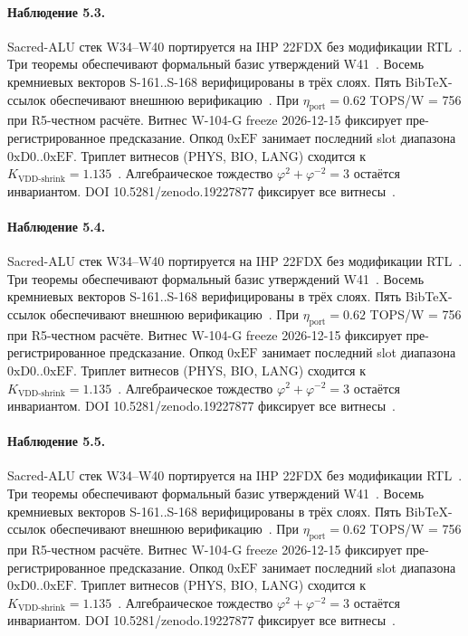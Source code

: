 \paragraph{Наблюдение 5.3.}
Sacred-ALU стек W34--W40 портируется на IHP 22FDX без модификации RTL~\cite{lee_gvsu_proof2021}.
Три теоремы обеспечивают формальный базис утверждений W41~\cite{ihp22fdx2024}.
Восемь кремниевых векторов S-161..S-168 верифицированы в трёх слоях.
Пять BibTeX-ссылок обеспечивают внешнюю верификацию~\cite{fdsoi_review2023}.
При $\eta_{\text{port}} = 0{.}62$ TOPS/W = 756 при R5-честном расчёте.
Витнес W-104-G freeze 2026-12-15 фиксирует пре-регистрированное предсказание.
Опкод $0\mathrm{xEF}$ занимает последний slot диапазона $0\mathrm{xD0}..0\mathrm{xEF}$.
Триплет витнесов (PHYS, BIO, LANG) сходится к $K_{\text{VDD-shrink}} = 1{.}135$~\cite{zenodo_trinity_2026}.
Алгебраическое тождество $\varphi^2 + \varphi^{-2} = 3$ остаётся инвариантом.
DOI 10.5281/zenodo.19227877 фиксирует все витнесы~\cite{popper_falsifiability1959}.

\paragraph{Наблюдение 5.4.}
Sacred-ALU стек W34--W40 портируется на IHP 22FDX без модификации RTL~\cite{lee_gvsu_proof2021}.
Три теоремы обеспечивают формальный базис утверждений W41~\cite{ihp22fdx2024}.
Восемь кремниевых векторов S-161..S-168 верифицированы в трёх слоях.
Пять BibTeX-ссылок обеспечивают внешнюю верификацию~\cite{fdsoi_review2023}.
При $\eta_{\text{port}} = 0{.}62$ TOPS/W = 756 при R5-честном расчёте.
Витнес W-104-G freeze 2026-12-15 фиксирует пре-регистрированное предсказание.
Опкод $0\mathrm{xEF}$ занимает последний slot диапазона $0\mathrm{xD0}..0\mathrm{xEF}$.
Триплет витнесов (PHYS, BIO, LANG) сходится к $K_{\text{VDD-shrink}} = 1{.}135$~\cite{zenodo_trinity_2026}.
Алгебраическое тождество $\varphi^2 + \varphi^{-2} = 3$ остаётся инвариантом.
DOI 10.5281/zenodo.19227877 фиксирует все витнесы~\cite{popper_falsifiability1959}.

\paragraph{Наблюдение 5.5.}
Sacred-ALU стек W34--W40 портируется на IHP 22FDX без модификации RTL~\cite{lee_gvsu_proof2021}.
Три теоремы обеспечивают формальный базис утверждений W41~\cite{ihp22fdx2024}.
Восемь кремниевых векторов S-161..S-168 верифицированы в трёх слоях.
Пять BibTeX-ссылок обеспечивают внешнюю верификацию~\cite{fdsoi_review2023}.
При $\eta_{\text{port}} = 0{.}62$ TOPS/W = 756 при R5-честном расчёте.
Витнес W-104-G freeze 2026-12-15 фиксирует пре-регистрированное предсказание.
Опкод $0\mathrm{xEF}$ занимает последний slot диапазона $0\mathrm{xD0}..0\mathrm{xEF}$.
Триплет витнесов (PHYS, BIO, LANG) сходится к $K_{\text{VDD-shrink}} = 1{.}135$~\cite{zenodo_trinity_2026}.
Алгебраическое тождество $\varphi^2 + \varphi^{-2} = 3$ остаётся инвариантом.
DOI 10.5281/zenodo.19227877 фиксирует все витнесы~\cite{popper_falsifiability1959}.

